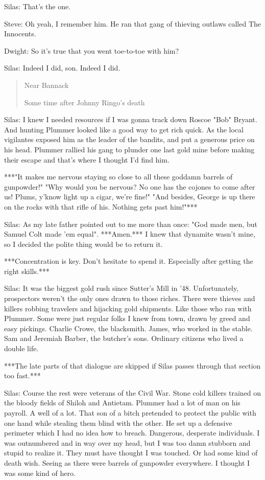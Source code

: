 \documentclass{article}
\begin{document}
Silas: That's the one.

Steve: Oh yeah, I remember him. He ran that gang of thieving outlaws called The Innocents.

Dwight: So it's true that you went toe-to-toe with him?

Silas: Indeed I did, son. Indeed I did.

\begin{quote}
    Near Bannack
    
    Some time after Johnny Ringo's death
\end{quote}

Silas: I knew I needed resources if I was gonna track down Roscoe "Bob" Bryant. And hunting Plummer looked like a good way to get rich quick. As the local vigilantes exposed him as the leader of the bandits, and put a generous price on his head. Plummer rallied his gang to plunder one last gold mine before making their escape and that's where I thought I'd find him.

***"It makes me nervous staying so close to all these goddamn barrels of gunpowder!" "Why would you be nervous? No one has the cojones to come after us! Plums, y'know light up a cigar, we're fine!" "And besides, George is up there on the rocks with that rifle of his. Nothing gets past him!"***

Silas: As my late father pointed out to me more than once: "God made men, but Samuel Colt made 'em equal". ***Amen.*** I knew that dynamite wasn't mine, so I decided the polite thing would be to return it.

***Concentration is key. Don't hesitate to spend it. Especially after getting the right skills.***

Silas: It was the biggest gold rush since Sutter's Mill in '48. Unfortunately, prospectors weren't the only ones drawn to those riches. There were thieves and killers robbing travelers and hijacking gold shipments. Like those who ran with Plummer. Some were just regular folks I knew from town, drawn by greed and easy pickings. Charlie Crowe, the blacksmith. James, who worked in the stable. Sam and Jeremiah Barber, the butcher's sons. Ordinary citizens who lived a double life.

***The late parts of that dialogue are skipped if Silas passes through that section too fast.***

Silas: Course the rest were veterans of the Civil War. Stone cold killers trained on the bloody fields of Shiloh and Antietam. Plummer had a lot of man on his payroll. A well of a lot. That son of a bitch pretended to protect the public with one hand while stealing them blind with the other. He set up a defensive perimeter which I had no idea how to breach. Dangerous, desperate individuals. I was outnumbered and in way over my head, but I was too damn stubborn and stupid to realize it. They must have thought I was touched. Or had some kind of death wish. Seeing as there were barrels of gunpowder everywhere. I thought I was some kind of hero.
\end{document}
